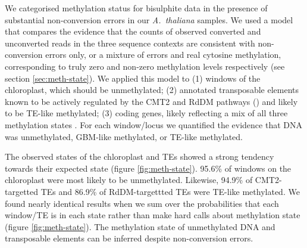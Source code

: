 \documentclass[twocolumn,twoside,lettersize]{article}
\begin{document}
We categorised methylation status for bisulphite data in the presence of substantial non-conversion errors in our \emph{A.~thaliana} samples.
We used a model that compares the evidence that the counts of observed converted and unconverted reads in the three sequence contexts are consistent with non-conversion errors only, or a mixture of errors and real cytosine methylation, corresponding to truly zero and non-zero methylation levels respectively (see section \ref{sec:meth-state}).
We applied this model to (1) windows of the chloroplast, which should be unmethylated; (2) annotated transposable elements known to be actively regulated by the CMT2 and RdDM pathways (\cite{stroud2013comprehensive}) and likely to be TE-like methylated; (3) coding genes, likely reflecting a mix of all three methylation states \parencite{zhang2020natural}.
For each window/locus we quantified the evidence that DNA was unmethylated, GBM-like methylated, or TE-like methylated.

The observed states of the chloroplast and TEs showed a strong tendency towards their expected state (figure \ref{fig:meth-state}).
95.6\% of windows on the chloroplast were most likely to be unmethylated.
Likewise, 94.9\% of CMT2-targetted TEs and 86.9\% of RdDM-targettted TEs were TE-like methylated.
We found nearly identical results when we sum over the probabilities that each window/TE is in each state rather than make hard calls about methylation state (figure \ref{fig:meth-state}).
The methylation state of unmethylated DNA and transposable elements can be inferred despite non-conversion errors.
\end{document}
